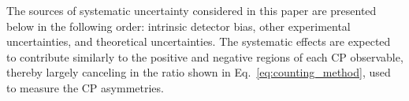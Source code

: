The sources of systematic uncertainty considered in this paper are presented below in the following order: intrinsic detector bias, other experimental uncertainties, and theoretical uncertainties.
The systematic effects are expected to contribute similarly to the positive and negative regions of each CP observable, thereby largely canceling in the ratio shown in Eq.~\eqref{eq:counting_method}, used to measure the CP asymmetries.
